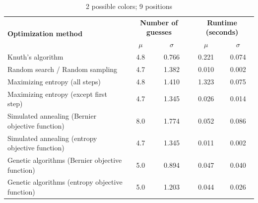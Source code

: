 \documentclass[11pt]{article}
\begin{document}
\begin{table}[h!]
\begin{center}
\begin{tabular}{l c c c c}
\toprule
\multirow{2}{*}{\bfseries Optimization method} 		& \multicolumn{2}{c}{\bfseries Number of guesses} 		& \multicolumn{2}{c}{\bfseries Runtime (seconds)}	\\
\cmidrule(lr){2-3}  \cmidrule(lr){4-5}				& $\mu$ & $\sigma$								& $\mu$ & $\sigma$							\\
\cmidrule(lr){1-5}
Knuth's algorithm							& 4.8 & 0.766									& 0.221 & 0.074							\\
Random search / Random sampling				& 4.7 & 1.382									& 0.010 & 0.002							\\
Maximizing entropy (all steps)					& 4.8 & 1.410									& 1.323 & 0.075							\\
Maximizing entropy (except first step)			& 4.7 & 1.345									& 0.026 & 0.014							\\
Simulated annealing (Bernier objective function)	& 8.0 & 1.774									& 0.052 & 0.086							\\
Simulated annealing (entropy objective function)	& 4.7 & 1.345									& 0.011 & 0.002							\\
Genetic algorithms (Bernier objective function)		& 5.0 & 0.894									& 0.047 & 0.040							\\
Genetic algorithms (entropy objective function)		& 5.0 & 1.203									& 0.044 & 0.026							\\
\bottomrule
\end{tabular}
\end{center}
\caption{2 possible colors; 9 positions}
\label{fig:compare_2_9}
\end{table}

\newpage
\end{document}
